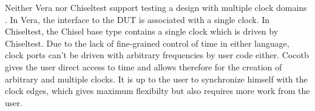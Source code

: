 Neither Vera nor Chiseltest support testing a design with multiple clock domains \cite[Sec.
7]{flake2020a}\cite{chiseltest_multiclock}. In Vera, the interface to the DUT is associated with a single clock. In
Chiseltest, the Chisel  base type contains a single clock which is driven by Chiseltest. Due to the lack of
fine-grained control of time in either language, clock ports can't be driven with arbitrary frequencies by user code either. Cocotb gives the user direct access to time and allows therefore for the creation of arbitrary and multiple clocks. It is up to the user to synchronize himself with the clock edges, which gives maximum flexibilty but also requires more work from the user. 

